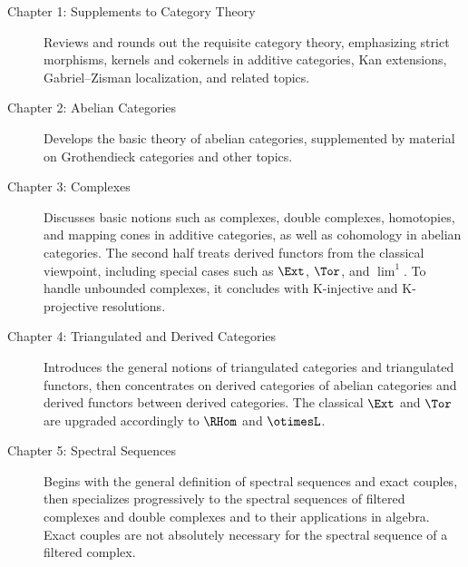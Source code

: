 \begin{description}
	\item[Chapter 1: Supplements to Category Theory] Reviews and rounds out the requisite category theory, emphasizing strict morphisms, kernels and cokernels in additive categories, Kan extensions, Gabriel--Zisman localization, and related topics.
	\item[Chapter 2: Abelian Categories] Develops the basic theory of abelian categories, supplemented by material on Grothendieck categories and other topics.
	\item[Chapter 3: Complexes] Discusses basic notions such as complexes, double complexes, homotopies, and mapping cones in additive categories, as well as cohomology in abelian categories. The second half treats derived functors from the classical viewpoint, including special cases such as $\Ext$, $\Tor$, and $\lim^1$. To handle unbounded complexes, it concludes with K-injective and K-projective resolutions.
	\item[Chapter 4: Triangulated and Derived Categories] Introduces the general notions of triangulated categories and triangulated functors, then concentrates on derived categories of abelian categories and derived functors between derived categories. The classical $\Ext$ and $\Tor$ are upgraded accordingly to $\RHom$ and $\otimesL$.
	\item[Chapter 5: Spectral Sequences] Begins with the general definition of spectral sequences and exact couples, then specializes progressively to the spectral sequences of filtered complexes and double complexes and to their applications in algebra. Exact couples are not absolutely necessary for the spectral sequence of a filtered complex.
\end{description}

